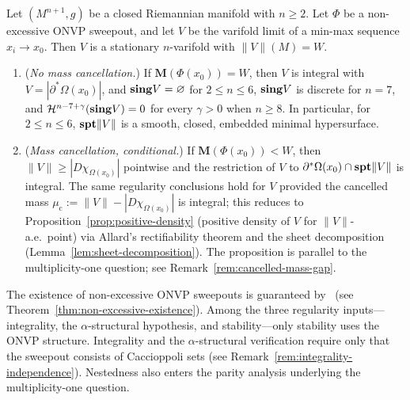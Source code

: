 \begin{theorem}\label{thm:non-excessive-main}
    Let $(M^{n+1}, g)$ be a closed Riemannian manifold with $n \geq 2$. Let $\Phi$ be a non-excessive ONVP sweepout, and let $V$ be the varifold limit of a min-max sequence $x_i \to x_0$. Then $V$ is a stationary $n$-varifold with $\|V\|(M) = W$.
    \begin{enumerate}[label=\textup{(\alph*)}]
        \item (\emph{No mass cancellation.}) If $\mathbf{M}(\Phi(x_0)) = W$, then $V$ is integral with $V = |\partial^*\Omega(x_0)|$, and $\mathbf{sing} V = \varnothing$ for $2 \leq n \leq 6$, $\mathbf{sing} V$ is discrete for $n = 7$, and $\mathcal{H}^{n-7+\gamma}(\mathbf{sing} V) = 0$ for every $\gamma > 0$ when $n \geq 8$. In particular, for $2 \leq n \leq 6$, $\mathbf{spt}\|V\|$ is a smooth, closed, embedded minimal hypersurface.
        \item (\emph{Mass cancellation, conditional.}) If $\mathbf{M}(\Phi(x_0)) < W$, then $\|V\| \geq |D\chi_{\Omega(x_0)}|$ pointwise and the restriction of $V$ to $\partial^*\Omega(x_0) \cap \mathbf{spt}\|V\|$ is integral. The same regularity conclusions hold for $V$ provided the cancelled mass $\mu_{\mathrm{c}} := \|V\| - |D\chi_{\Omega(x_0)}|$ is integral; this reduces to Proposition~\ref{prop:positive-density} (positive density of $V$ for $\|V\|$-a.e.\ point) via Allard's rectifiability theorem and the sheet decomposition (Lemma~\ref{lem:sheet-decomposition}).  The proposition is parallel to the multiplicity-one question; see Remark~\ref{rem:cancelled-mass-gap}.
    \end{enumerate}
\end{theorem}

\begin{remark}\label{rem:existence-vs-regularity}
The existence of non-excessive ONVP sweepouts is guaranteed by~\cite[Theorem~2.2]{CLS22} (see Theorem~\ref{thm:non-excessive-existence}). Among the three regularity inputs---integrality, the $\alpha$-structural hypothesis, and stability---only stability uses the ONVP structure. Integrality and the $\alpha$-structural verification require only that the sweepout consists of Caccioppoli sets (see Remark~\ref{rem:integrality-independence}). Nestedness also enters the parity analysis underlying the multiplicity-one question.
\end{remark}

